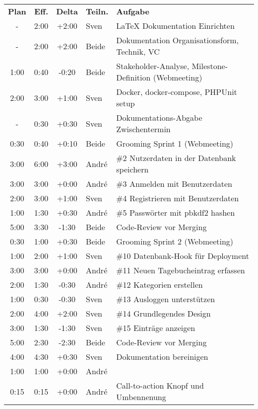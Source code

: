 \begin{longtable}{ c c c l l }
  \textbf{Plan} & \textbf{Eff.} & \textbf{Delta} & \textbf{Teiln.} & \textbf{Aufgabe} \\
  - & 2:00 & +2:00 & Sven & LaTeX Dokumentation Einrichten \\
  - & 2:00 & +2:00 & Beide & Dokumentation Organisationsform, Technik, VC\\
  1:00 & 0:40 & -0:20 & Beide & Stakeholder-Analyse, Milestone-Definition (Webmeeting) \\
  2:00 & 3:00 & +1:00 & Sven & Docker, docker-compose, PHPUnit setup \\
  - & 0:30 & +0:30 & Sven & Dokumentations-Abgabe Zwischentermin \\ 
  0:30 & 0:40 & +0:10 & Beide & Grooming Sprint 1 (Webmeeting) \\
  3:00 & 6:00 & +3:00 & André & \#2 Nutzerdaten in der Datenbank speichern \\
  3:00 & 3:00 & +0:00 & André & \#3 Anmelden mit Benutzerdaten \\
  2:00 & 3:00 & +1:00 & Sven & \#4 Registrieren mit Benutzerdaten \\
  1:00 & 1:30 & +0:30 & André & \#5 Passwörter mit pbkdf2 hashen \\
  5:00 & 3:30 & -1:30 & Beide & Code-Review vor Merging \\
  0:30 & 1:00 & +0:30 & Beide & Grooming Sprint 2 (Webmeeting) \\
  1:00 & 2:00 & +1:00 & Sven & \#10 Datenbank-Hook für Deployment \\
  3:00 & 3:00 & +0:00 & André & \#11 Neuen Tagebucheintrag erfassen \\
  2:00 & 1:30 & -0:30 & André & \#12 Kategorien erstellen \\
  1:00 & 0:30 & -0:30 & Sven & \#13 Ausloggen unterstützen \\
  2:00 & 4:00 & +2:00 & Sven & \#14 Grundlegendes Design \\
  3:00 & 1:30 & -1:30 & Sven & \#15 Einträge anzeigen \\
  5:00 & 2:30 & -2:30 & Beide & Code-Review vor Merging \\
  4:00 & 4:30 & +0:30 & Sven & Dokumentation bereinigen \\
  1:00 & 1:00 & +0:00 & André & #22 Commit-Version anzeigen \\
  0:15 & 0:15 & +0:00 & André & Call-to-action Knopf und Umbennenung \\
\end{longtable}
